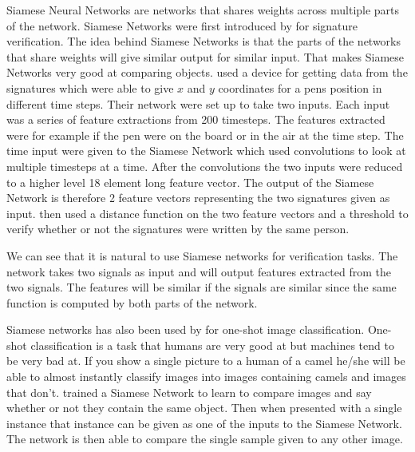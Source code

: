Siamese Neural Networks are networks that shares weights across multiple parts
of the network. Siamese Networks were first introduced by \cite{NIPS1993_769}
for signature verification. The idea behind Siamese Networks is that the parts
of the networks that share weights will give similar output for similar input.
That makes Siamese Networks very good at comparing objects. \cite{NIPS1993_769}
used a device for getting data from the signatures which were able to give $x$
and $y$ coordinates for a pens position in different time steps. Their network
were set up to take two inputs. Each input was a series of feature extractions
from 200 timesteps. The features extracted were for example if the pen were on
the board or in the air at the time step. The time input were given to the
Siamese Network which used convolutions to look at multiple timesteps at a time.
After the convolutions the two inputs were reduced to a higher level 18 element
long feature vector. The output of the Siamese Network is therefore 2 feature
vectors representing the two signatures given as input. \cite{NIPS1993_769} then
used a distance function on the two feature vectors and a threshold to verify
whether or not the signatures were written by the same person.

We can see that it is natural to use Siamese networks for verification tasks.
The network takes two signals as input and will output features extracted from
the two signals. The features will be similar if the signals are similar since
the same function is computed by both parts of the network.

Siamese networks has also been used by \cite{Koch2015SiameseNN} for one-shot
image classification. One-shot classification is a task that humans are very
good at but machines tend to be very bad at. If you show a single picture to a
human of a camel he/she will be able to almost instantly classify images into
images containing camels and images that don't. \cite{Koch2015SiameseNN} trained
a Siamese Network to learn to compare images and say whether or not they contain
the same object. Then when presented with a single instance that instance can be
given as one of the inputs to the Siamese Network. The network is then able to
compare the single sample given to any other image.

